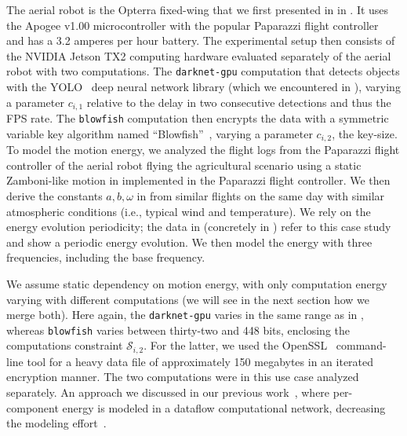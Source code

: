 The aerial robot is the Opterra fixed-wing that we first presented in  in . It uses the Apogee v1.00 microcontroller with the popular Paparazzi flight controller~\citep{papa} and has a 3.2 amperes per hour battery. The experimental setup then consists of the NVIDIA Jetson TX2 computing hardware evaluated separately of the aerial robot with two computations. The {\small\tt darknet-gpu} computation that detects objects with the YOLO~\citep{redmon2016you} deep neural network library (which we encountered in ), varying a parameter $c_{i,1}$ relative to the delay in two consecutive detections and thus the FPS rate. The {\small\tt blowfish} computation then encrypts the data with a symmetric variable key algorithm named ``Blowfish''~\citep{schneier1993description}, varying a parameter $c_{i,2}$, the key-size. To model the motion energy, we analyzed the flight logs from the Paparazzi flight controller of the aerial robot flying the agricultural scenario using a static Zamboni-like motion in  implemented in the Paparazzi flight controller. We then derive the constants $a,b,\omega$ in  from similar flights on the same day with similar atmospheric conditions (i.e., typical wind and temperature). We rely on the energy evolution periodicity; the data in  (concretely in ) refer to this case study and show a periodic energy evolution. We then model the energy with three frequencies, including the base frequency.

We assume static dependency on motion energy, with only computation energy varying with different computations (we will see in the next section how we merge both). Here again, the {\small\tt darknet-gpu} varies in the same range as in , whereas {\small\tt blowfish} varies between thirty-two and 448 bits, enclosing the computations constraint $\mathcal{S}_{i,2}$. For the latter, we used the OpenSSL~\citep{viega2002network} command-line tool for a heavy data file of approximately 150 megabytes in an iterated encryption manner. The two computations were in this use case analyzed separately. An approach we discussed in our previous work~\citep{seewald2019coarse}, where per-component energy is modeled in a dataflow computational network, decreasing the modeling effort~\citep{seewald2020mechanical}.

